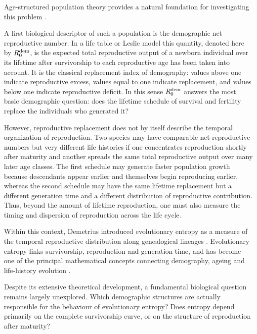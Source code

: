 \documentclass[10pt,a4paper]{amsart}
\theoremstyle{definition}
\theoremstyle{remark}
\numberwithin{equation}{section}
\begin{document}
Age-structured population theory provides a natural foundation for
investigating this problem
\cite{Leslie1945,Keyfitz1968,Cus,ElaydiCushing2024,Charlesworth}.

A first biological descriptor of such a population is the demographic net reproductive number. In a life table or Leslie model this quantity, denoted here by $R_0^{\rm dem}$, is the expected total reproductive output of a newborn individual over its lifetime after survivorship to each reproductive age has been taken into account. It is the classical replacement index of demography: values above one indicate reproductive excess, values equal to one indicate replacement, and values below one indicate reproductive deficit. In this sense $R_0^{\rm dem}$ answers the most basic demographic question: does the lifetime schedule of survival and fertility replace the individuals who generated it?

However, reproductive replacement does not by itself describe the temporal organization of reproduction. Two species may have comparable net reproductive numbers but very different life histories if one concentrates reproduction shortly after maturity and another spreads the same total reproductive output over many later age classes. The first schedule may generate faster population growth because descendants appear earlier and themselves begin reproducing earlier, whereas the second schedule may have the same lifetime replacement but a different generation time and a different distribution of reproductive contribution. Thus, beyond the amount of lifetime reproduction, one must also measure the timing and dispersion of reproduction across the life cycle.

Within this context, Demetrius introduced evolutionary entropy as a
measure of the temporal reproductive distribution
along genealogical lineages
\cite{Demetrius78,Demetrius83,Demetrius97,Demetrius2004,
Demetrius2013}.
Evolutionary entropy links survivorship, reproduction and generation
time, and has become one of the principal mathematical concepts
connecting demography, ageing and life-history evolution
\cite{Demetrius83,Demetrius97,Demetrius2013}.

Despite its extensive theoretical development, a fundamental biological
question remains largely unexplored. Which demographic structures are
actually responsible for the behaviour of evolutionary entropy?
Does entropy depend primarily on the complete survivorship curve, or on
the structure of reproduction after maturity?
\end{document}
